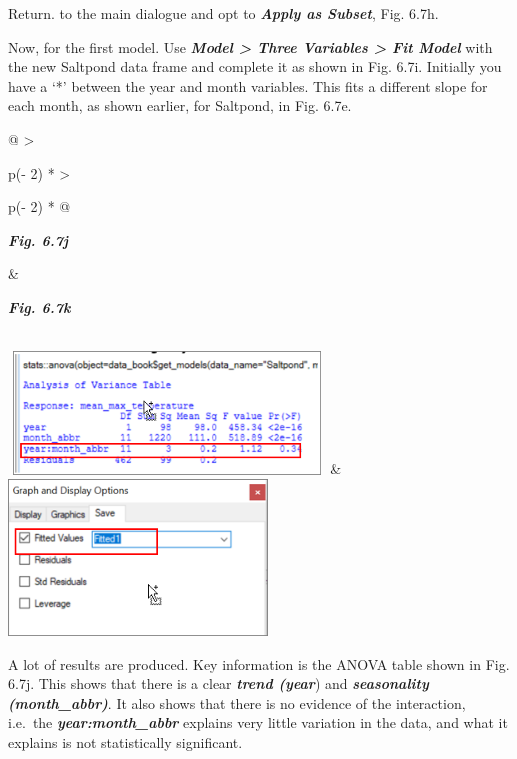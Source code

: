\documentclass[
  letterpaper,
  DIV=11,
  numbers=noendperiod]{scrreprt}
\begin{document}
Return. to the main dialogue and opt to \textbf{\emph{Apply as Subset}},
Fig. 6.7h.

Now, for the first model. Use \textbf{\emph{Model \textgreater{} Three
Variables \textgreater{} Fit Model}} with the new Saltpond data frame
and complete it as shown in Fig. 6.7i. Initially you have a `*' between
the year and month variables. This fits a different slope for each
month, as shown earlier, for Saltpond, in Fig. 6.7e.

\begin{longtable}[]{@{}
  >{\raggedright\arraybackslash}p{(\columnwidth - 2\tabcolsep) * }
  >{\raggedright\arraybackslash}p{(\columnwidth - 2\tabcolsep) * }@{}}
\toprule\noalign{}
\begin{minipage}[b]{\linewidth}\raggedright
\textbf{\emph{Fig. 6.7j}}
\end{minipage} & \begin{minipage}[b]{\linewidth}\raggedright
\textbf{\emph{Fig. 6.7k}}
\end{minipage} \\
\midrule\noalign{}
\endhead
\bottomrule\noalign{}
\endlastfoot
\includegraphics[width=3.30832in,height=1.28529in]{figures/Fig6.7j.png}
&
\includegraphics[width=2.70761in,height=1.63468in]{figures/Fig6.7k.png} \\
\end{longtable}

A lot of results are produced. Key information is the ANOVA table shown
in Fig. 6.7j. This shows that there is a clear \textbf{\emph{trend
(year}}) and \textbf{\emph{seasonality (month\_abbr)}}. It also shows
that there is no evidence of the interaction, i.e.~the
\textbf{\emph{year:month\_abbr}} explains very little variation in the
data, and what it explains is not statistically significant.
\end{document}
